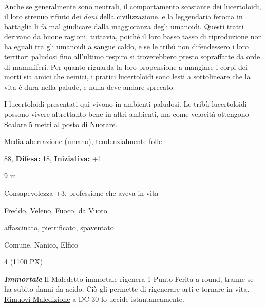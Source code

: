 \begin{multicols}{2}
{Anche se generalmente sono neutrali, il comportamento scostante dei lucertoloidi, il loro strenuo rifiuto dei \emph{doni} della civilizzazione, e la leggendaria ferocia in battaglia li fa mal giudicare dalla maggioranza degli umanoidi. Questi tratti derivano da buone ragioni, tuttavia, poiché il loro basso tasso di riproduzione non ha eguali tra gli umanoidi a sangue caldo, e se le tribù non difendessero i loro territori paludosi fino all'ultimo respiro si troverebbero presto sopraffatte da orde di mammiferi. Per quanto riguarda la loro propensione a mangiare i corpi dei morti sia amici che nemici, i pratici lucertoloidi sono lesti a sottolineare che la vita è dura nella palude, e nulla deve andare sprecato.

I lucertoloidi presentati qui vivono in ambienti paludosi. Le tribù lucertoloidi possono vivere altrettanto bene in altri ambienti, ma come velocità ottengono Scalare 5 metri al posto di Nuotare.


\noindent
\begin{description}[noitemsep, topsep=0pt, parsep=0pt, partopsep=0pt, leftmargin=0cm, labelwidth=2.2cm]
	\item[\textbf{Taglia/Tipo:}] Media aberrazione (umano), tendenzialmente folle
	\item[\textbf{Caratt.:}] 
	\item[\textbf{Punti Ferita:}] 88,  \textbf{Difesa:} 18,  \textbf{Iniziativa:} +1
	\item[\textbf{Movimento:}] 9 m
	\item[\textbf{Tiri Salvez.:}] 
	\item[\textbf{Comp.:}] Consapevolezza +3, professione che aveva in vita
	\item[\textbf{Imm. Danni:}] Freddo, Veleno, Fuoco, da Vuoto
	\item[\textbf{Immunità:}] affascinato, pietrificato, spaventato
	\item[\textbf{Linguaggi:}] Comune, Nanico, Elfico
	\item[\textbf{Sfida:}] 4 (1100 PX)\smallskip
\end{description}

\emph{\textbf{Immortale}} Il Maledetto immortale rigenera 1 Punto Ferita a round, tranne se ha subito danni da acido. Ciò gli permette di rigenerare arti e tornare in vita. \hyperlink{Rimuovi Maledizione}{Rimuovi Maledizione} a DC 30 lo uccide istantaneamente.

}
\end{multicols}
